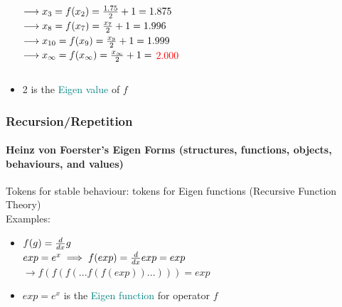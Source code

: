\documentclass[
	11pt,
	aspectratio=169,
]{beamer}
\begin{document}
\begin{frame}
\begin{itemize}
\begin{columns}
                                    $\longrightarrow x_3=f(x_2) = {{1.75}\over{2}} + 1 = 1.875$\\
                                    $\longrightarrow x_8=f(x_7) = {{x_7}\over{2}} + 1 = 1.996$\\
                                    $\longrightarrow x_{10}=f(x_9) = {{x_9}\over{2}} + 1 = 1.999$\\
                                    $\longrightarrow x_\infty=f(x_\infty) = {{x_\infty}\over{2}} + 1 =$ \textcolor{red}{$2.000$}\\ 
                            \end{columns}
                        \item<2-> 2 is the \textcolor{teal}{Eigen value} of $f$
                    \end{itemize}
                \end{frame}
                \begin{frame}
                    \frametitle{Recursion/Repetition}
                    \framesubtitle{Heinz von Foerster's Eigen Forms (structures, functions, objects, behaviours, and values)}
                    Tokens for stable behaviour: tokens for Eigen functions (Recursive Function Theory)\\
                    Examples:
                    \begin{itemize}
                        \item<1-> $f(g)= {{d}\over{dx}}g$\\
                            $exp=e^x \implies f(exp) = {{d}\over{dx}}exp = exp$\\
                            $\longrightarrow f(f(f(...f(f(exp))...))) = exp$\\
                        \item<2-> $exp = e^x$ is the \textcolor{teal}{Eigen function} for operator $f$
                    \end{itemize}
                \end{frame}
\end{document}
